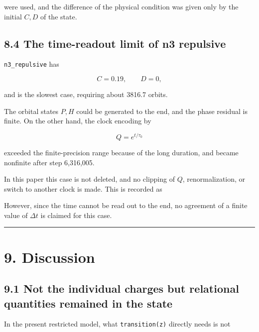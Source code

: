 \documentclass[
  a4paper,
]{article}
\begin{document}
were used, and the difference of the physical condition was given only
by the initial \(C,D\) of the state.

\subsection{8.4 The time-readout limit of n3
repulsive}\label{the-time-readout-limit-of-n3-repulsive}

\texttt{n3\_repulsive} has

\[
C=0.19,
\qquad
D=0,
\]

and is the slowest case, requiring about 3816.7 orbits.

The orbital states \(P,H\) could be generated to the end, and the phase
residual is finite. On the other hand, the clock encoding by

\[
Q=e^{t/\tau_0}
\]

exceeded the finite-precision range because of the long duration, and
became nonfinite after step 6,316,005.

In this paper this case is not deleted, and no clipping of \(Q\),
renormalization, or switch to another clock is made. This is recorded as

\begin{center}
\end{center}

However, since the time cannot be read out to the end, no agreement of a
finite value of \(\Delta t\) is claimed for this case.

\begin{center}\rule{0.5\linewidth}{0.5pt}\end{center}

\section{9. Discussion}\label{discussion}

\subsection{9.1 Not the individual charges but relational quantities
remained in the
state}\label{not-the-individual-charges-but-relational-quantities-remained-in-the-state}

In the present restricted model, what \texttt{transition(z)} directly
needs is not
\end{document}
